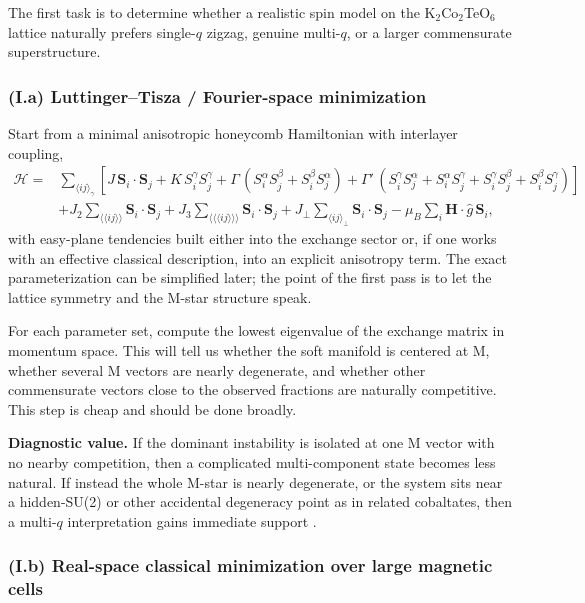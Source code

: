\documentclass[11pt]{article}
\begin{document}
The first task is to determine whether a realistic spin model on the K$_2$Co$_2$TeO$_6$ lattice naturally prefers single-$q$ zigzag, genuine multi-$q$, or a larger commensurate superstructure.

\subsubsection*{(I.a) Luttinger--Tisza / Fourier-space minimization}

Start from a minimal anisotropic honeycomb Hamiltonian with interlayer coupling,
\begin{align}
\mathcal{H} = {}& \sum_{\langle ij \rangle_\gamma}
\left[J\,\mathbf{S}_i\!\cdot\!\mathbf{S}_j
+K\,S_i^\gamma S_j^\gamma
+\Gamma\,(S_i^\alpha S_j^\beta + S_i^\beta S_j^\alpha)
+\Gamma'\,(S_i^\gamma S_j^\alpha + S_i^\alpha S_j^\gamma + S_i^\gamma S_j^\beta + S_i^\beta S_j^\gamma)\right] \\
&+ J_2 \sum_{\langle\langle ij\rangle\rangle} \mathbf{S}_i\!\cdot\!\mathbf{S}_j
+ J_3 \sum_{\langle\langle\langle ij\rangle\rangle\rangle} \mathbf{S}_i\!\cdot\!\mathbf{S}_j
+ J_\perp \sum_{\langle ij\rangle_\perp} \mathbf{S}_i\!\cdot\!\mathbf{S}_j
- \mu_B \sum_i \mathbf{H}\!\cdot\!\hat g\,\mathbf{S}_i,
\end{align}
with easy-plane tendencies built either into the exchange sector or, if one works with an effective classical description, into an explicit anisotropy term. The exact parameterization can be simplified later; the point of the first pass is to let the lattice symmetry and the M-star structure speak.

For each parameter set, compute the lowest eigenvalue of the exchange matrix in momentum space. This will tell us whether the soft manifold is centered at M, whether several M vectors are nearly degenerate, and whether other commensurate vectors close to the observed fractions are naturally competitive. This step is cheap and should be done broadly.

\textbf{Diagnostic value.} If the dominant instability is isolated at one M vector with no nearby competition, then a complicated multi-component state becomes less natural. If instead the whole M-star is nearly degenerate, or the system sits near a hidden-SU(2) or other accidental degeneracy point as in related cobaltates, then a multi-$q$ interpretation gains immediate support \cite{Kruger2023TripleQNCTO,Maksimov2024NCSOmultiq}.

\subsubsection*{(I.b) Real-space classical minimization over large magnetic cells}
\end{document}
